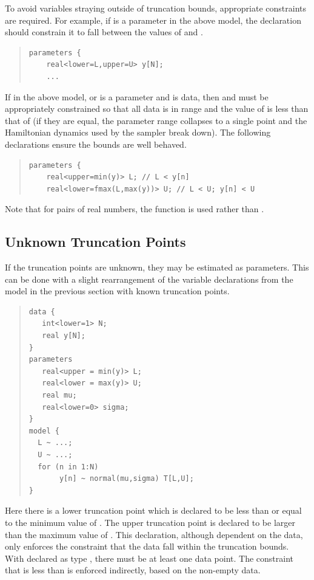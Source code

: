 To avoid variables straying outside of truncation bounds, appropriate
constraints are required.  For example, if  is a parameter in
the above model, the declaration should constrain it to fall between
the values of  and .
%
\begin{quote}
\begin{Verbatim}
parameters {
    real<lower=L,upper=U> y[N];
    ...
\end{Verbatim}
\end{quote}

If in the above model,  or  is a parameter and
 is data, then  and  must be appropriately
constrained so that all data is in range and the value of  is
less than that of  (if they are equal, the parameter range
collapses to a single point and the Hamiltonian dynamics used by 
the sampler break down).  The following declarations ensure the bounds
are well behaved.
%
\begin{quote}
\begin{Verbatim}
parameters {
    real<upper=min(y)> L; // L < y[n]
    real<lower=fmax(L,max(y))> U; // L < U; y[n] < U
\end{Verbatim}
\end{quote}
%
Note that for pairs of real numbers, the function  is used
rather than .







\subsection{Unknown Truncation Points}

If the truncation points are unknown, they may be estimated as
parameters.  This can be done with a slight rearrangement of the
variable declarations from the model in the previous section with
known truncation points.
%
\begin{quote}
\begin{Verbatim}
data {
   int<lower=1> N;
   real y[N];
}
parameters
   real<upper = min(y)> L; 
   real<lower = max(y)> U;
   real mu;
   real<lower=0> sigma;
}
model {
  L ~ ...;  
  U ~ ...;
  for (n in 1:N)
       y[n] ~ normal(mu,sigma) T[L,U];
}
\end{Verbatim}
\end{quote}
%
Here there is a lower truncation point  which is declared to
be less than or equal to the minimum value of .  The upper
truncation point  is declared to be larger than the maximum
value of .  This declaration, although dependent on the data,
only enforces the constraint that the data fall within the truncation
bounds.  With  declared as type , there must be
at least one data point.  The constraint that  is less than
 is enforced indirectly, based on the non-empty data.


